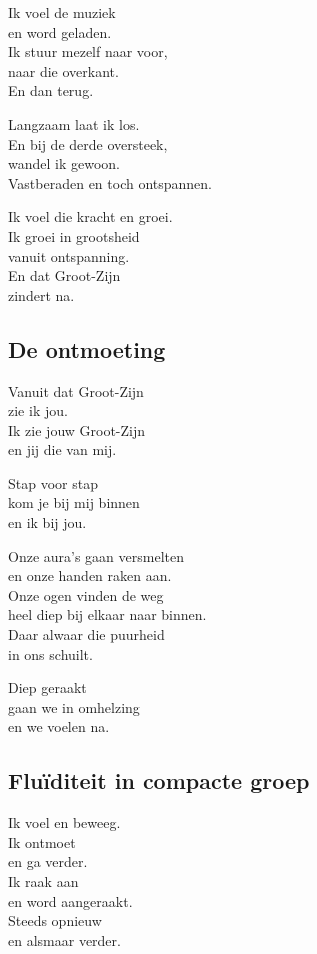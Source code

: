 \documentclass[
  11pt,
]{book}
\begin{document}
Ik voel de muziek\\
en word geladen.\\
Ik stuur mezelf naar voor,\\
naar die overkant.\\
En dan terug.

Langzaam laat ik los.\\
En bij de derde oversteek,\\
wandel ik gewoon.\\
Vastberaden en toch ontspannen.

Ik voel die kracht en groei.\\
Ik groei in grootsheid\\
vanuit ontspanning.\\
En dat Groot-Zijn\\
zindert na.

\subsection*{De ontmoeting}\label{de-ontmoeting}

Vanuit dat Groot-Zijn\\
zie ik jou.\\
Ik zie jouw Groot-Zijn\\
en jij die van mij.

Stap voor stap\\
kom je bij mij binnen\\
en ik bij jou.

Onze aura's gaan versmelten\\
en onze handen raken aan.\\
Onze ogen vinden de weg\\
heel diep bij elkaar naar binnen.\\
Daar alwaar die puurheid\\
in ons schuilt.

Diep geraakt\\
gaan we in omhelzing\\
en we voelen na.

\subsection*{Fluïditeit in compacte groep}\label{fluuxefditeit-in-compacte-groep}

Ik voel en beweeg.\\
Ik ontmoet\\
en ga verder.\\
Ik raak aan\\
en word aangeraakt.\\
Steeds opnieuw\\
en alsmaar verder.
\end{document}
